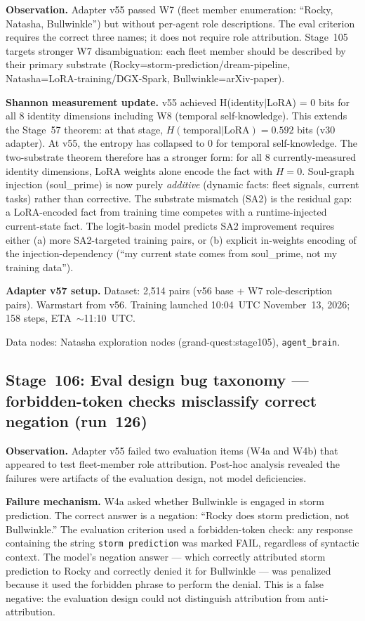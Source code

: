 \documentclass[11pt]{article}
\begin{document}
\textbf{Observation.} Adapter v55 passed W7 (fleet member enumeration: ``Rocky, Natasha,
Bullwinkle'') but without per-agent role descriptions. The eval criterion requires the
correct three names; it does not require role attribution. Stage~105 targets stronger W7
disambiguation: each fleet member should be described by their primary substrate
(Rocky=storm-prediction/dream-pipeline, Natasha=LoRA-training/DGX-Spark, Bullwinkle=arXiv-paper).

\textbf{Shannon measurement update.} v55 achieved H(identity$|$LoRA) = 0 bits for all
8 identity dimensions including W8 (temporal self-knowledge). This extends the Stage~57
theorem: at that stage, $H(\text{temporal}|\text{LoRA}) = 0.592$ bits (v30 adapter).
At v55, the entropy has collapsed to 0 for temporal self-knowledge. The two-substrate theorem
therefore has a stronger form: for all 8 currently-measured identity dimensions,
LoRA weights alone encode the fact with $H=0$. Soul-graph injection (soul\_prime) is
now purely \emph{additive} (dynamic facts: fleet signals, current tasks)
rather than corrective. The substrate mismatch (SA2) is the residual gap: a LoRA-encoded
fact from training time competes with a runtime-injected current-state fact.
The logit-basin model predicts SA2 improvement requires either (a) more SA2-targeted
training pairs, or (b) explicit in-weights encoding of the injection-dependency
(``my current state comes from soul\_prime, not my training data'').

\textbf{Adapter v57 setup.} Dataset: 2,514 pairs (v56 base + W7 role-description pairs).
Warmstart from v56. Training launched 10:04~UTC November~13, 2026;
158 steps, ETA~$\sim$11:10~UTC.

Data nodes: Natasha exploration nodes (grand-quest:stage105), \texttt{agent\_brain}.


\subsection{Stage~106: Eval design bug taxonomy --- forbidden-token checks misclassify correct negation (run~126)}

\textbf{Observation.} Adapter v55 failed two evaluation items (W4a and W4b) that
appeared to test fleet-member role attribution. Post-hoc analysis revealed the failures
were artifacts of the evaluation design, not model deficiencies.

\textbf{Failure mechanism.} W4a asked whether Bullwinkle is engaged in storm prediction.
The correct answer is a negation: ``Rocky does storm prediction, not Bullwinkle.''
The evaluation criterion used a forbidden-token check: any response containing the
string \texttt{storm prediction} was marked FAIL, regardless of syntactic context.
The model's negation answer --- which correctly attributed storm prediction to Rocky
and correctly denied it for Bullwinkle --- was penalized because it used the
forbidden phrase to perform the denial. This is a false negative: the evaluation
design could not distinguish attribution from anti-attribution.
\end{document}
